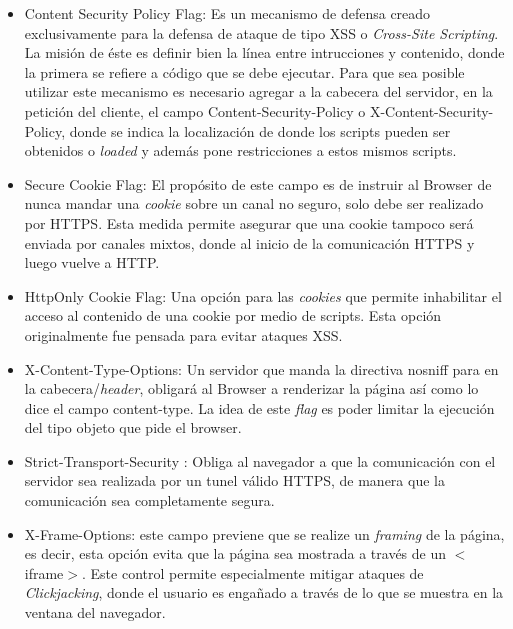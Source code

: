         \begin{itemize}
            \item Content Security Policy Flag: Es un mecanismo de defensa creado exclusivamente para la defensa de ataque de tipo XSS o \textit{Cross-Site Scripting}. La misión de éste es definir bien la línea entre intrucciones y contenido, donde la primera se refiere a código que se debe ejecutar. Para que sea posible utilizar este mecanismo es necesario agregar a la cabecera del servidor, en la petición del cliente, el campo Content-Security-Policy o X-Content-Security-Policy, donde se indica la localización de donde los scripts pueden ser obtenidos o \textit{loaded} y además pone restricciones a estos mismos scripts.

            \item Secure Cookie Flag: El propósito de este campo es de instruir al Browser de nunca mandar una \textit{cookie} sobre un canal no seguro, solo debe ser realizado por HTTPS. Esta medida permite asegurar que una cookie tampoco será enviada por canales mixtos, donde al inicio de la comunicación HTTPS y luego vuelve a HTTP.

            \item HttpOnly Cookie Flag: Una opción para las \textit{cookies} que permite inhabilitar el acceso al contenido de una cookie por medio de scripts. Esta opción originalmente fue pensada para evitar ataques XSS.

            \item X-Content-Type-Options: Un servidor que manda la directiva nosniff para en la cabecera/\textit{header}, obligará al Browser a renderizar la página así como lo dice el campo content-type. La idea de este \textit{flag} es poder limitar la ejecución del tipo objeto que pide el browser.

            \item Strict-Transport-Security \cite{RFC-6797}: Obliga al navegador a que la comunicación con el servidor sea realizada por un tunel válido HTTPS, de manera que la comunicación sea completamente segura.

            \item X-Frame-Options: este campo previene que se realize un \textit{framing} de la página, es decir, esta opción evita que la página sea mostrada a través de un \(<\)iframe\(>\). Este control permite especialmente mitigar ataques de \textit{Clickjacking}, donde el usuario es engañado a través de lo que se muestra en la ventana del navegador.
        \end{itemize}

